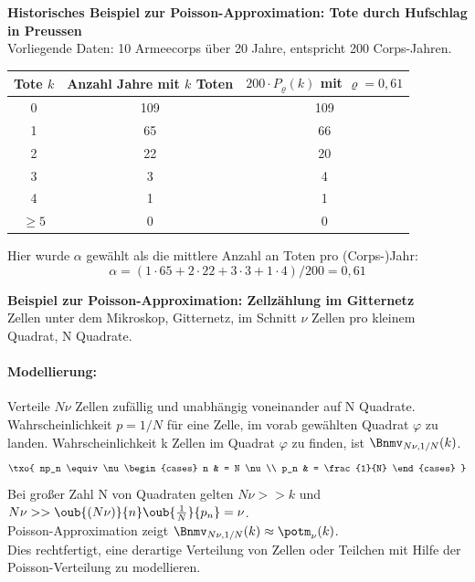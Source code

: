 \begin{bsp}
    \textbf{Historisches Beispiel zur Poisson-Approximation: Tote durch Hufschlag in Preussen}  \\
    Vorliegende Daten: 10 Armeecorps über 20 Jahre,
    entspricht 200 Corps-Jahren.
    \begin{mytable}
        \begin{tabular}{|c|c|c|}
            \hline
            Tote $k$ & Anzahl Jahre mit $k$ Toten & $200 \cdot P_\varrho(k)$ mit $\varrho = 0{,}61$ \\
            \hline
            0 & 109 & 109 \\
            1 & 65  & 66  \\
            2 & 22  & 20  \\
            3 & 3   & 4   \\
            4 & 1   & 1   \\
            $\geq 5$ & 0 & 0 \\
            \hline
        \end{tabular}
        \caption{Die durch Schlag eines Pferdes im preussischen Heere Getöteten (Ladislaus von Bortkiewicz, Das Gesetz der kleinen Zahlen, Teubner (1898))}
    \end{mytable}
    Hier wurde $\alpha$ gewählt als die mittlere Anzahl an Toten pro (Corps-)Jahr:
    \[
        \alpha = (1 · 65 + 2 · 22 + 3 · 3 + 1 · 4)/200 = 0, 61
    \]
\end{bsp}

\begin{bsp}
    \textbf{Beispiel zur Poisson-Approximation: Zellzählung im Gitternetz}  \\
    Zellen unter dem Mikroskop, Gitternetz, im Schnitt $\nu$ Zellen pro kleinem Quadrat, N Quadrate.
    \paragraph{Modellierung:} Verteile $N \nu$ Zellen zufällig und unabhängig voneinander auf N Quadrate.
    Wahrscheinlichkeit $p = 1/N$ für eine Zelle, im vorab gewählten Quadrat $\varphi$ zu landen.
    Wahrscheinlichkeit k Zellen im Quadrat $\varphi$ zu finden, ist $\Bnmv_{N\nu , 1/N}(k)$. \\
    \[
        \txo{ np_n \equiv \nu
        \begin{cases}
            n  & = N \nu \\
            p_n & = \frac{1}{N}
        \end{cases}
        }
    \]
    Bei großer Zahl N von Quadraten gelten $N \nu >> k$ und $N \nu >> \oub{(N\nu)}{n}  \oub{\frac{1}{N}}{p_n} = \nu$. \\
    Poisson-Approximation zeigt $\Bnmv_{N\nu , 1/N}(k) \approx \potm_{\nu}(k)$. \\
    Dies rechtfertigt, eine derartige Verteilung von Zellen oder Teilchen mit Hilfe der
    Poisson-Verteilung zu modellieren.
\end{bsp}

